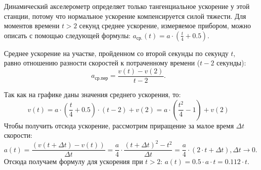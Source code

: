 Динамический акселерометр определяет только тангенциальное ускорение у этой станции, потому что нормальное ускорение компенсируется 
силой тяжести. Для моментов времени $t > 2$ секунд среднее ускорение, измеряемое прибором, можно описать с помощью следующей формулы:  
$a_{\text{ср.}}(t)=a \cdot (\frac{t}{4}+0.5)$.

Среднее ускорение на участке, пройденном со второй секунды по секунду $t$, равно отношению разности скоростей к потраченному 
времени ($t - 2$ секунды):
$$a_{\text{ср.пер}}=\frac{v(t)-v(2)}{t-2}.$$

Так как на графике даны значения среднего ускорения, то: 
$$v(t)=a \cdot \left(\frac{t}{4}+0.5\right) \cdot (t-2)+v(2)=a \cdot \left(\frac{t^2}{4}-1\right)+v(2) $$
Чтобы получить отсюда ускорение, рассмотрим приращение за малое время $\Delta t$ скорости:
$$a(t)=\frac{(v(t+\Delta t)-v(t))}{\Delta t}=\frac{a}{4} \cdot \frac{(t+\Delta t)^2-t^2}{\Delta t}=\frac{a}{4} \cdot (2 \cdot t+\Delta t),\Delta t \rightarrow 0.$$
Отсюда получаем формулу для ускорения при $t>2$:  $a(t)=0.5 \cdot a \cdot t=0.112 \cdot t$.

